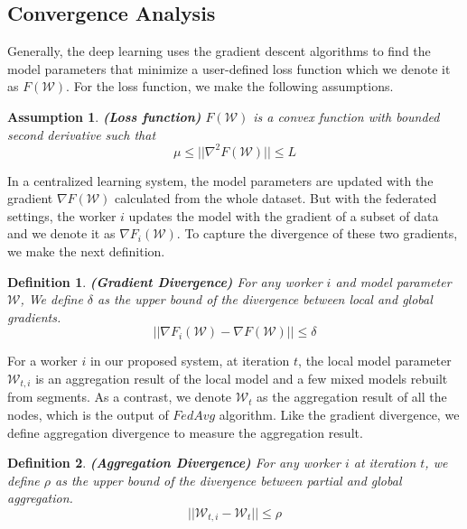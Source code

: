 
\subsection{Convergence Analysis}

\newtheorem{theorem}{\bf Theorem}
\newtheorem{define}{\bf Definition}
\newtheorem{assumption}{\bf Assumption}

Generally, the deep learning uses the gradient descent algorithms to find the model parameters that minimize a user-defined loss function which we denote it as $F(\mathcal{W})$. For the loss function, we make the following assumptions.

\begin{assumption}
{\bf (Loss function)} $F(\mathcal{W})$ is a convex function with bounded second derivative such that
\begin{equation}
    \mu \leq ||\nabla^2F(\mathcal{W})|| \leq L
\end{equation}
\end{assumption}

In a centralized learning system, the model parameters are updated with the gradient $\nabla F(\mathcal{W})$ calculated from the whole dataset. But with the federated settings, the worker $i$ updates the model with the gradient of a subset of data and we denote it as $\nabla F_i(\mathcal{W})$. To capture the divergence of these two gradients, we make the next definition.

\begin{define}
    {\bf (Gradient Divergence)} For any worker $i$ and model parameter $\mathcal{W}$, We define $\delta$ as the upper bound of the divergence between local and global gradients.
    \begin{equation}
      || \nabla F_i(\mathcal{W}) - \nabla F(\mathcal{W})|| \leq \delta
    \end{equation}
\end{define}

For a worker $i$ in our proposed system, at iteration $t$, the local model parameter $\mathcal{W}_{t,i}$ is an aggregation result of the local model and a few mixed models rebuilt from segments. As a contrast, we denote $\mathcal{W}_{t}$ as the aggregation result of all the nodes, which is the output of $FedAvg$ algorithm. Like the gradient divergence, we define aggregation divergence to measure the aggregation result.

\begin{define}
    {\bf (Aggregation Divergence)} For any worker $i$ at iteration $t$, we define $\rho$ as the upper bound of the divergence between partial and global aggregation.
    \begin{equation}
      || \mathcal{W}_{t,i} - \mathcal{W}_{t}|| \leq \rho
    \end{equation}
\end{define}

